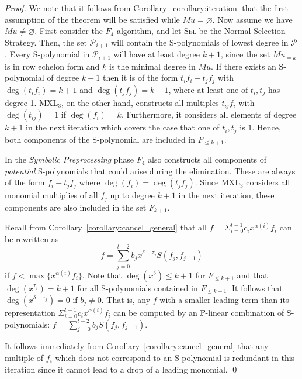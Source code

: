\begin{proof}
We note that it follows from Corollary~\ref{corollary:iteration} that the first assumption of the theorem will be satisfied while $Mu = \varnothing$. Now assume we have $Mu \neq \varnothing$.
First consider the $F_4$ algorithm, and let \textsc{Sel} be the Normal Selection Strategy. Then, the set $\mathcal{P}_{i+1}$ will contain the S-polynomials of lowest degree in $\mathcal{P}$. Every S-polynomial in $\mathcal{P}_{i+1}$ will have at least degree $k+1$, since the set $Mu_{=k}$ is in row echelon form and $k$ is the minimal degree in $Mu$. If there exists an S-poly\-nomial of degree $k+1$ then it is of the form $t_i f_i - t_j f_j$ with $\deg(t_i f_i) = k+1$ and $\deg(t_j f_j) = k+1$, where at least one of $t_i,t_j$ has degree 1. MXL$_3$, on the other hand, constructs all multiples $t_{ij} f_i$ with $\deg(t_{ij}) = 1$ if $\deg(f_i) = k$. Furthermore, it considers all elements of degree $k+1$ in the next iteration which covers the case that one of $t_i,t_j$ is $1$.  Hence, both components of the S-polynomial are included in $F_{\leq k+1}$.

In the \emph{Symbolic Preprocessing} phase $F_4$ also constructs all components of \emph{potential} S-polynomials that could arise during the elimination. These are always of the form $f_i - t_jf_j$ where $\deg(f_i) = \deg(t_jf_j)$. Since MXL$_3$ considers all monomial multiplies of all $f_j$ up to degree $k+1$ in the next iteration, these components are also included in the set $F_{k+1}$.

Recall from Corollary~\ref{corollary:cancel_general} that all $f = \Sigma^{t-1}_{i=0} c_ix^{\alpha(i)}f_i$ can be rewritten as $$f = \sum_{j=0}^{t-2} b_{j}x^{\delta-\tau_{j}}S(f_j,f_{j+1})$$ if $f < \max\{x^{\alpha(i)}f_i\}$. Note that $\deg(x^\delta) \leq k+1$ for $F_{\leq k+1}$ and that $\deg(x^{\tau_{j}}) = k + 1$ for all S-polynomials contained in $F_{\leq k+1}$. It follows that $\deg(x^{\delta - \tau_{j}}) = 0$ if $b_{j} \neq 0$. That is, any $f$ with a smaller leading term than its representation $\Sigma^{t-1}_{i=0} c_ix^{\alpha(i)}f_i$ can be computed by an ${\mathbb F}$-linear combination of S-polynomials: $f = \sum_{j=0}^{t-2} b_{j}S(f_j,f_{j+1})$.

It follows immediately from Corollary~\ref{corollary:cancel_general} that any multiple of $f_i$ which does not correspond to an S-polynomial is redundant in this iteration since it cannot lead to a drop of a leading monomial. \qed
\end{proof}

